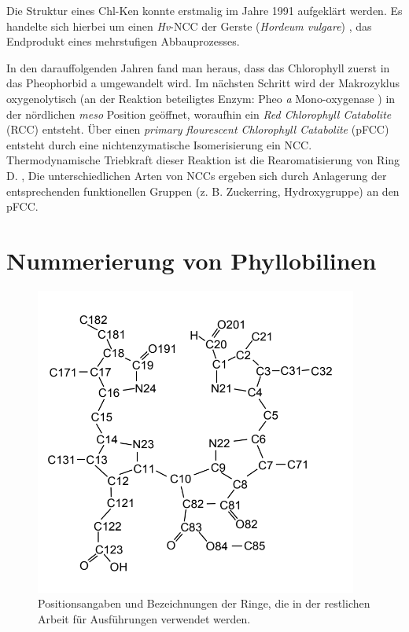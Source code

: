Die Struktur eines \gls{Chl-K}en konnte erstmalig im Jahre 1991 aufgeklärt werden. Es handelte sich hierbei um einen \textit{Hv}-\gls{NCC} der Gerste (\textit{Hordeum vulgare}) \cite{ErsterKatabolit}, das Endprodukt eines mehrstufigen Abbauprozesses. 

In den darauffolgenden Jahren fand man heraus, dass das Chlorophyll zuerst in das Pheophorbid a umgewandelt wird. Im nächsten Schritt wird der Makrozyklus oxygenolytisch (an der Reaktion beteiligtes Enzym: Pheo \textit{a} Mono-oxygenase \cite{ChlorophyllCatabolitesEnzyme}) in der nördlichen \textit{meso} Position geöffnet, woraufhin ein \textit{Red Chlorophyll Catabolite} (RCC) entsteht. 
Über einen \textit{primary flourescent Chlorophyll Catabolite} (pFCC) entsteht durch eine nichtenzymatische Isomerisierung ein \gls{NCC}. Thermodynamische Triebkraft dieser Reaktion ist die Rearomatisierung von Ring D. \cite{FCCKatabolit}, \cite{ChlorophyllCatabolites} Die unterschiedlichen Arten von \gls{NCC}s ergeben sich durch Anlagerung der entsprechenden funktionellen Gruppen (z. B. Zuckerring, Hydroxygruppe) an den pFCC. \cite{ChlorophyllCatabolites} 

\section{Nummerierung von Phyllobilinen}

\begin{figure}[!hbtp]
  \centering
  \includegraphics[scale=0.61]{figures/Kapitel2/VWA_Chl-Nummerierung.png}
  \caption[Nummerierung von Phyllobilinen, Quelle: Mathias Scherl]{Positionsangaben und Bezeichnungen der Ringe, die in der restlichen Arbeit für Ausführungen verwendet werden.}
  \label{fig:NummerierungPhyllobiline}
\end{figure}



